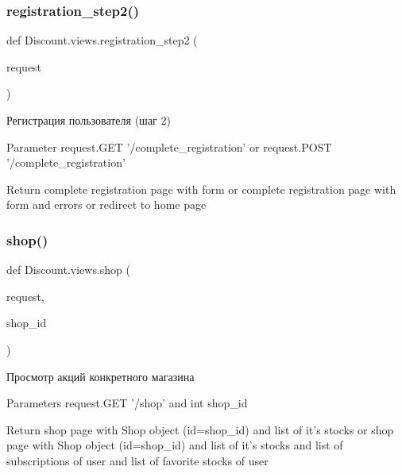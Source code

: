 \subsubsection{\texorpdfstring{registration\+\_\+step2()}{registration\_step2()}}
{\footnotesize\ttfamily def Discount.\+views.\+registration\+\_\+step2 (\begin{DoxyParamCaption}\item[{}]{request }\end{DoxyParamCaption})}

\begin{DoxyVerb}Регистрация пользователя (шаг 2)

Parameter
    request.GET '/complete_registration' or request.POST '/complete_registration'

Return
    complete registration page with form
    or
    complete registration page with form and errors
    or
    redirect to home page
\end{DoxyVerb}
 \mbox{\label{namespace_discount_1_1views_a5a3728b3017c05f1c8ccabd832f3fdd5}} 
\subsubsection{\texorpdfstring{shop()}{shop()}}
{\footnotesize\ttfamily def Discount.\+views.\+shop (\begin{DoxyParamCaption}\item[{}]{request,  }\item[{}]{shop\+\_\+id }\end{DoxyParamCaption})}

\begin{DoxyVerb}Просмотр акций конкретного магазина

Parameters
    request.GET '/shop' and int shop_id

Return
    shop page with Shop object (id=shop_id) and list of it's stocks
    or
    shop page with Shop object (id=shop_id) and list of it's stocks and list of subscriptions of user and list of favorite stocks of user
\end{DoxyVerb}
 \mbox{\label{namespace_discount_1_1views_aaf1abec1101e66c5e419f25d92712b2d}} 
